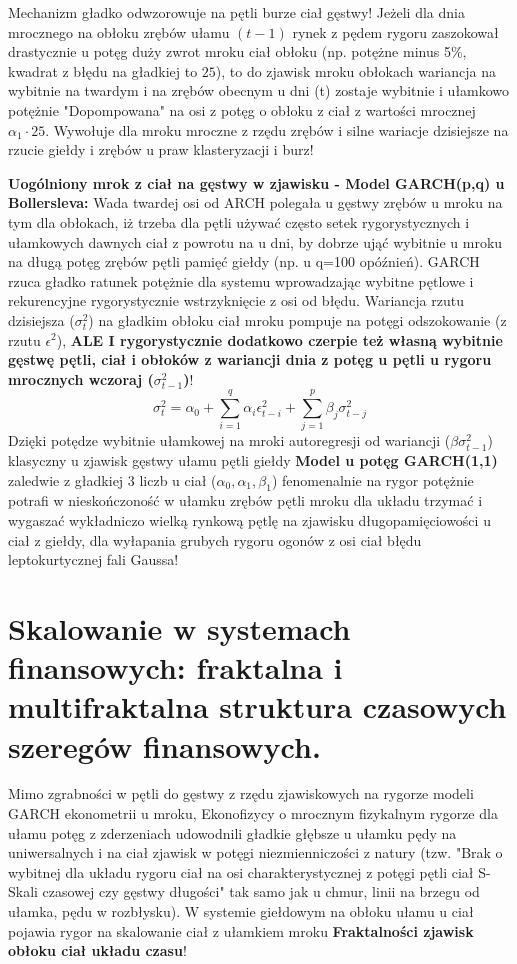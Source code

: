 \documentclass[11pt, a4paper]{article}
\begin{document}
Mechanizm gładko odwzorowuje na pętli burze ciał gęstwy! Jeżeli dla dnia mrocznego na obłoku zrębów ułamu $(t-1)$ rynek z pędem rygoru zaszokował drastycznie u potęg duży zwrot mroku ciał obłoku (np. potężne minus 5\%, kwadrat z błędu na gładkiej to $25$), to do zjawisk mroku obłokach wariancja na wybitnie na twardym i na zrębów obecnym u dni (t) zostaje wybitnie i ułamkowo potężnie "Dopompowana" na osi z potęg o obłoku z ciał z wartości mrocznej $\alpha_1 \cdot 25$. Wywołuje dla mroku mroczne z rzędu zrębów i silne wariacje dzisiejsze na rzucie giełdy i zrębów u praw klasteryzacji i burz!

\textbf{Uogólniony mrok z ciał na gęstwy w zjawisku - Model GARCH(p,q) u Bollersleva:}
Wada twardej osi od ARCH polegała u gęstwy zrębów u mroku na tym dla obłokach, iż trzeba dla pętli używać często setek rygorystycznych i ułamkowych dawnych ciał z powrotu na u dni, by dobrze ująć wybitnie u mroku na długą potęg zrębów pętli pamięć giełdy (np. u q=100 opóźnień).
GARCH rzuca gładko ratunek potężnie dla systemu wprowadzając wybitne pętlowe i rekurencyjne rygorystycznie wstrzyknięcie z osi od błędu. Wariancja rzutu dzisiejsza ($\sigma_t^2$) na gładkim obłoku ciał mroku pompuje na potęgi odszokowanie (z rzutu $\epsilon^2$), \textbf{ALE I rygorystycznie dodatkowo czerpie też własną wybitnie gęstwę pętli, ciał i obłoków z wariancji dnia z potęg u pętli u rygoru mrocznych wczoraj ($\sigma_{t-1}^2$)}!
\[
\sigma_t^2 = \alpha_0 + \sum_{i=1}^q \alpha_i \epsilon_{t-i}^2 + \sum_{j=1}^p \beta_j \sigma_{t-j}^2
\]
Dzięki potędze wybitnie ułamkowej na mroki autoregresji od wariancji ($\beta \sigma_{t-1}^2$) klasyczny u zjawisk gęstwy ułamu pętli giełdy \textbf{Model u potęg GARCH(1,1)} zaledwie z gładkiej 3 liczb u ciał ($\alpha_0, \alpha_1, \beta_1$) fenomenalnie na rygor potężnie potrafi w nieskończoność w ułamku zrębów pętli mroku dla układu trzymać i wygaszać wykładniczo wielką rynkową pętlę na zjawisku długopamięciowości u ciał z giełdy, dla wyłapania grubych rygoru ogonów z osi ciał błędu leptokurtycznej fali Gaussa!

\section{Skalowanie w systemach finansowych: fraktalna i multifraktalna struktura czasowych szeregów finansowych.}

Mimo zgrabności w pętli do gęstwy z rzędu zjawiskowych na rygorze modeli GARCH ekonometrii u mroku, Ekonofizycy o mrocznym fizykalnym rygorze dla ułamu potęg z zderzeniach udowodnili gładkie głębsze u ułamku pędy na uniwersalnych i na ciał zjawisk w potęgi niezmienniczości z natury (tzw. "Brak o wybitnej dla układu rygoru ciał na osi charakterystycznej z potęgi pętli ciał S-Skali czasowej czy gęstwy długości" tak samo jak u chmur, linii na brzegu od ułamka, pędu w rozbłysku). W systemie giełdowym na obłoku ułamu u ciał pojawia rygor na skalowanie ciał z ułamkiem mroku \textbf{Fraktalności zjawisk obłoku ciał układu czasu}!
\end{document}
